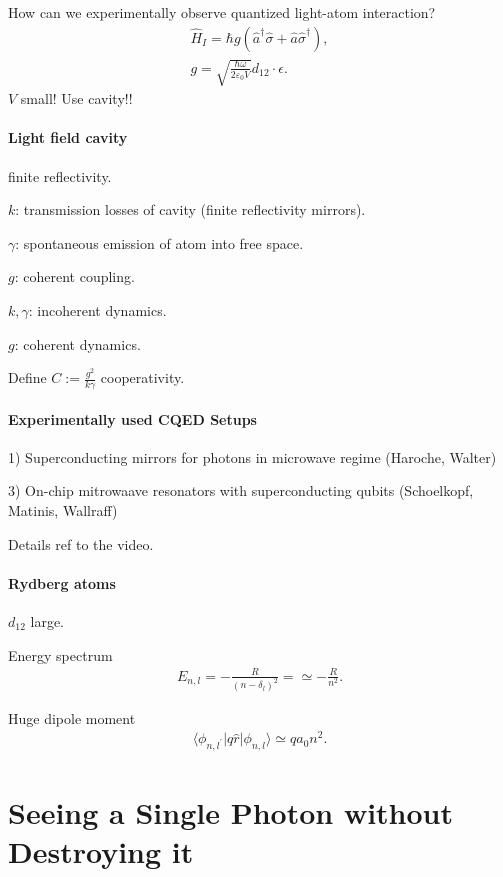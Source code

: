 \documentclass[../../note.tex]{subfiles}
\begin{document}
How can we experimentally observe quantized light-atom interaction?
\begin{align}
    \hat{H}_I = \hbar g(\hat{a}^{\dagger} \hat{\sigma} + \hat{a} \hat{\sigma}^{\dagger}), \\
    g = \sqrt{\frac{\hbar \omega}{2 \varepsilon_0 V}} d_{12} \cdot \epsilon.
\end{align}
$V$ small! Use cavity!! 

\paragraph*{Light field cavity}
finite reflectivity.

$k$: transmission losses of cavity (finite reflectivity mirrors).

$\gamma$: spontaneous emission of atom into free space.

$g$: coherent coupling.

$k, \gamma$: incoherent dynamics.

$g$: coherent dynamics.

Define $C := \frac{g^2}{k \gamma}$ cooperativity.

\paragraph*{Experimentally used CQED Setups}
1) Superconducting mirrors for photons in microwave regime (Haroche, Walter)

3) On-chip mitrowaave resonators with superconducting qubits (Schoelkopf, Matinis, Wallraff) 

Details ref to the video.

\paragraph*{Rydberg atoms}
$d_{12}$ large.

Energy spectrum
\begin{align}
    E_{n,l} = - \frac{R}{(n-\delta_{l})^2} = \simeq - \frac{R}{n^2}.
\end{align}

Huge dipole moment
\begin{align}
    \langle \phi_{n, l^{\prime}} \vert q \hat{r} \vert \phi_{n, l} \rangle \simeq q a_0 n^2.
\end{align}

\section{Seeing a Single Photon without Destroying it}
\end{document}

